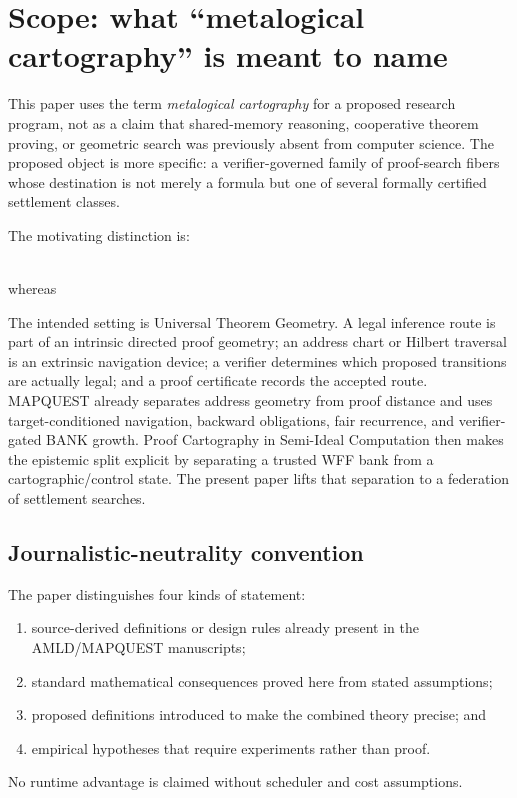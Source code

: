 \documentclass[11pt]{article}
\begin{document}
\tableofcontents
\newpage

\section{Scope: what ``metalogical cartography'' is meant to name}

This paper uses the term \emph{metalogical cartography} for a proposed research program, not as a claim that shared-memory reasoning, cooperative theorem proving, or geometric search was previously absent from computer science. The proposed object is more specific: a verifier-governed family of proof-search fibers whose destination is not merely a formula but one of several formally certified settlement classes.

The motivating distinction is:
\begin{center}
\\[0.45em]
whereas\\[0.45em]
\end{center}

The intended setting is Universal Theorem Geometry. A legal inference route is part of an intrinsic directed proof geometry; an address chart or Hilbert traversal is an extrinsic navigation device; a verifier determines which proposed transitions are actually legal; and a proof certificate records the accepted route. MAPQUEST already separates address geometry from proof distance and uses target-conditioned navigation, backward obligations, fair recurrence, and verifier-gated BANK growth. Proof Cartography in Semi-Ideal Computation then makes the epistemic split explicit by separating a trusted WFF bank from a cartographic/control state. The present paper lifts that separation to a federation of settlement searches.

\subsection{Journalistic-neutrality convention}

The paper distinguishes four kinds of statement:
\begin{enumerate}[label=(\roman*)]
\item source-derived definitions or design rules already present in the AMLD/MAPQUEST manuscripts;
\item standard mathematical consequences proved here from stated assumptions;
\item proposed definitions introduced to make the combined theory precise; and
\item empirical hypotheses that require experiments rather than proof.
\end{enumerate}
No runtime advantage is claimed without scheduler and cost assumptions.
\end{document}

